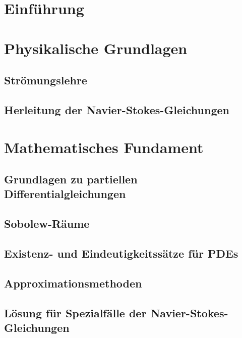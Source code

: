 \documentclass[11pt,a4paper]{article}
\theoremstyle{definition}
\numberwithin{equation}{section} %
\begin{document}
\section{Einführung}



\section{Physikalische Grundlagen}

\subsection{Strömungslehre}

\subsection{Herleitung der Navier-Stokes-Gleichungen}

\section{Mathematisches Fundament}

\subsection{Grundlagen zu partiellen Differentialgleichungen}



\subsection{Sobolew-Räume}



\subsection{Existenz- und Eindeutigkeitssätze für PDEs}

\subsection{Approximationsmethoden}



\subsection{Lösung für Spezialfälle der Navier-Stokes-Gleichungen}
\end{document}
